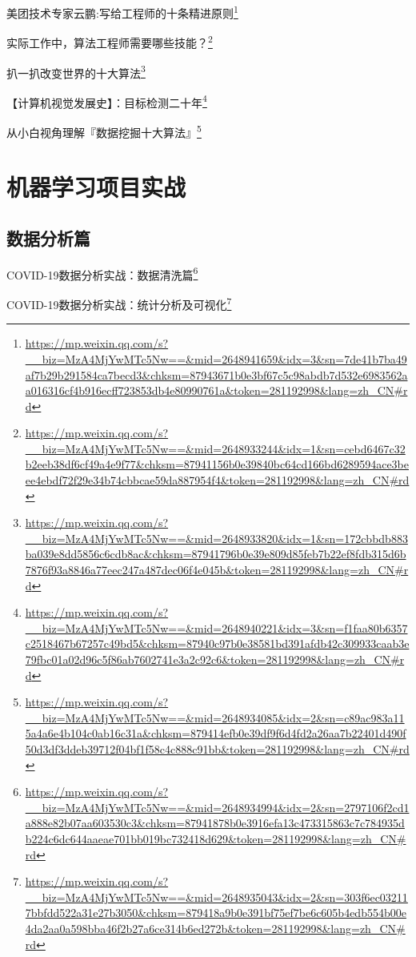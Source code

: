\documentclass[]{ctexbook}
\renewcommand{\href}[2]{#2\footnote{\url{#1}}}
\begin{document}
\href{https://mp.weixin.qq.com/s?__biz=MzA4MjYwMTc5Nw==\&mid=2648941659\&idx=3\&sn=7de41b7ba49af7b29b291584ca7becd3\&chksm=87943671b0e3bf67c5c98abdb7d532e6983562aa016316cf4b916ecff723853db4e80990761a\&token=281192998\&lang=zh_CN\#rd}{美团技术专家云鹏:写给工程师的十条精进原则}

\href{https://mp.weixin.qq.com/s?__biz=MzA4MjYwMTc5Nw==\&mid=2648933244\&idx=1\&sn=cebd6467c32b2eeb38df6cf49a4e9f77\&chksm=87941156b0e39840bc64cd166bd6289594ace3beee4ebdf72f29e34b74cbbcae59da887954f4\&token=281192998\&lang=zh_CN\#rd}{实际工作中，算法工程师需要哪些技能？}

\href{https://mp.weixin.qq.com/s?__biz=MzA4MjYwMTc5Nw==\&mid=2648933820\&idx=1\&sn=172cbbdb883ba039e8dd5856c6cdb8ac\&chksm=87941796b0e39e809d85feb7b22ef8fdb315d6b7876f93a8846a77eec247a487dec06f4e045b\&token=281192998\&lang=zh_CN\#rd}{扒一扒改变世界的十大算法}

\href{https://mp.weixin.qq.com/s?__biz=MzA4MjYwMTc5Nw==\&mid=2648940221\&idx=3\&sn=f1faa80b6357c2518467b67257c49bd5\&chksm=87940c97b0e38581bd391afdb42c309933caab3e79fbc01a02d96c5f86ab7602741e3a2c92c6\&token=281192998\&lang=zh_CN\#rd}{【计算机视觉发展史】：目标检测二十年}

\href{https://mp.weixin.qq.com/s?__biz=MzA4MjYwMTc5Nw==\&mid=2648934085\&idx=2\&sn=c89ac983a115a4a6e4b104c0ab16c31a\&chksm=879414efb0e39df9f6d4fd2a26aa7b22401d490f50d3df3ddeb39712f04bf1f58c4c888c91bb\&token=281192998\&lang=zh_CN\#rd}{从小白视角理解『数据挖掘十大算法』}

\hypertarget{ux673aux5668ux5b66ux4e60ux9879ux76eeux5b9eux6218}{%
\chapter{机器学习项目实战}\label{ux673aux5668ux5b66ux4e60ux9879ux76eeux5b9eux6218}}

\hypertarget{ux6570ux636eux5206ux6790ux7bc7}{%
\section{数据分析篇}\label{ux6570ux636eux5206ux6790ux7bc7}}

\href{https://mp.weixin.qq.com/s?__biz=MzA4MjYwMTc5Nw==\&mid=2648934994\&idx=2\&sn=2797106f2cd1a888e82b07aa603530c3\&chksm=87941878b0e3916efa13c473315863c7c784935db224c6dc644aaeae701bb019bc732418d629\&token=281192998\&lang=zh_CN\#rd}{COVID-19数据分析实战：数据清洗篇}

\href{https://mp.weixin.qq.com/s?__biz=MzA4MjYwMTc5Nw==\&mid=2648935043\&idx=2\&sn=303f6ec032117bbfdd522a31e27b3050\&chksm=879418a9b0e391bf75ef7be6c605b4edb554b00e4da2aa0a598bba46f2b27a6ce314b6ed272b\&token=281192998\&lang=zh_CN\#rd}{COVID-19数据分析实战：统计分析及可视化}
\end{document}
